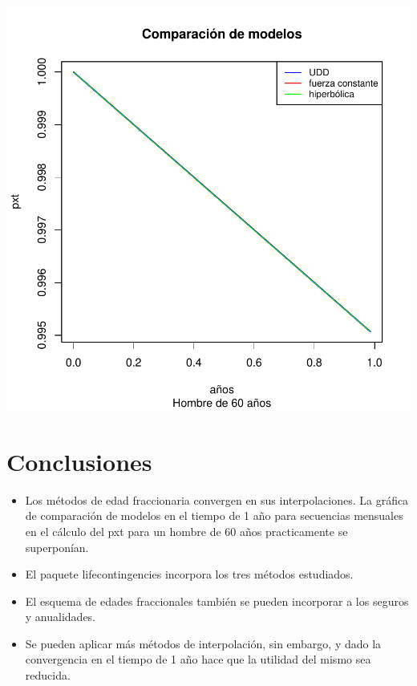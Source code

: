 \documentclass[12pt]{report}
\begin{document}
\includegraphics{Trabajo-Final-003}




\chapter{Conclusiones}

\begin{itemize}
\item Los métodos de edad fraccionaria convergen en sus interpolaciones. La gráfica de comparación de modelos en el tiempo de 1 año para secuencias mensuales en el cálculo del pxt para un hombre de 60 años practicamente se superponían.
\item El paquete lifecontingencies incorpora los tres métodos estudiados.
\item El esquema de edades fraccionales también se pueden incorporar a los seguros y anualidades.
\item Se pueden aplicar más métodos de interpolación, sin embargo, y dado la convergencia en el tiempo de 1 año hace que la utilidad del mismo sea reducida.
\end{itemize}



\printbibliography[
heading=bibintoc,
title={Bibliograf\'ia}
]

\printbibliography[heading=subbibintoc,type=article,title={Articles only}]
\end{document}

